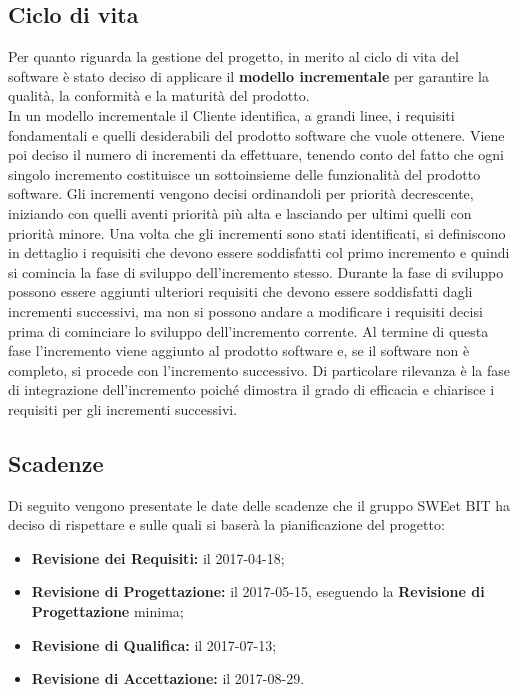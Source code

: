 \subsection{Ciclo di vita}
Per quanto riguarda la gestione del progetto, in merito al ciclo di vita del software è stato deciso di applicare il \textbf{modello incrementale} per garantire la qualità, la conformità e la maturità del prodotto. \\
In un modello incrementale il Cliente identifica, a grandi linee, i requisiti fondamentali e quelli desiderabili del prodotto software che vuole ottenere. Viene poi deciso il numero di incrementi da effettuare, tenendo conto del fatto che ogni singolo incremento costituisce un sottoinsieme delle funzionalità del prodotto software. Gli incrementi vengono decisi ordinandoli per priorità decrescente, iniziando con quelli aventi priorità più alta e lasciando per ultimi quelli con priorità minore. Una volta che gli incrementi sono stati identificati, si definiscono in dettaglio i requisiti che devono essere soddisfatti col primo incremento e quindi si comincia la fase di sviluppo dell'incremento stesso. Durante la fase di sviluppo possono essere aggiunti ulteriori requisiti che devono essere soddisfatti dagli incrementi successivi, ma non si possono andare a modificare i requisiti decisi prima di cominciare lo sviluppo dell'incremento corrente. Al termine di questa fase l'incremento viene aggiunto al prodotto software e, se il software non è completo, si procede con l'incremento successivo. Di particolare rilevanza è la fase di integrazione dell'incremento poiché dimostra il grado di efficacia e chiarisce i requisiti per gli incrementi successivi.
\subsection{Scadenze}
Di seguito vengono presentate le date delle scadenze che il gruppo SWEet BIT ha deciso di rispettare e sulle quali si baserà la pianificazione del progetto: \\
\begin{itemize}
	\item \textbf{Revisione dei Requisiti:} il 2017-04-18;
	\item \textbf{Revisione di Progettazione:} il 2017-05-15, eseguendo la \textbf{Revisione di Progettazione} minima;
	\item \textbf{Revisione di Qualifica:} il 2017-07-13;
	\item \textbf{Revisione di Accettazione:} il 2017-08-29.
\end{itemize}